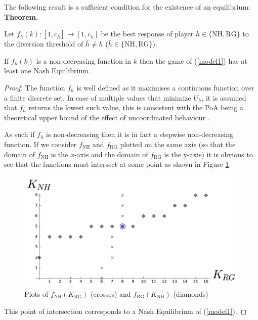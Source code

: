 \documentclass{article}
\newcommand{\NH}{\text{NH}}
\newcommand{\RG}{\text{RG}}
\begin{document}
The following result is a sufficient condition for the existence of an equilibrium:\\


\textbf{Theorem.}

Let $f_{h}(k):[1,c_{\bar h}]\to[1,c_h]$ be the best response of player $h\in\{\NH, \RG\}$ to the diversion threshold of $\bar h\ne h$ ($\bar h\in\{\NH, \RG\}$).

If $f_{h}(k)$ is a non-decreasing function in $k$ then the game of
(\ref{model1}) has at least one Nash Equilibrium.


\begin{proof}

The function $f_h$ is well defined as it maximises a continuous function over a finite discrete set.
In case of multiple values that minimize $U_h$, it is assumed that $f_h$ returns the lowest such value, this is consistent with the PoA being a theoretical upper bound of the effect of uncoordinated behaviour \cite{TimRoughgarden}.

As such if $f_h$ is non-decreasing then it is in fact a stepwise non-decreasing function.
If we consider $f_{\NH}$ and $f_{\RG}$ plotted on the same axis (so that the domain of $f_{\NH}$ is the $x$-axis and the domain of $f_{\RG}$ is the y-axis) it is obvious to see that the functions must intersect at some point as shown in Figure \ref{exampleforproof}.

\begin{figure}[!htbp]
    \begin{center}
        \includegraphics[width=.7\textwidth]{./Images/best_responses_ex_for_proof.pdf}
    \end{center}
    \caption{Plots of $f_{\NH}(K_{\RG})$ (crosses) and $f_{\RG}(K_{\NH})$ (diamonds)}\label{exampleforproof}
\end{figure}

This point of intersection corresponds to a Nash Equilibrium of (\ref{model1}).

\end{proof}
\end{document}
